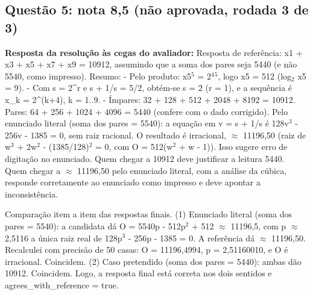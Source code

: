 \documentclass{article}%
\begin{document}
\subsection*{Questão 5: nota 8,5 (não aprovada, rodada 3 de 3)}%
\textbf{Resposta da resolução às cegas do avaliador:} Resposta de referência: x1 + x3 + x5 + x7 + x9 = 10912, assumindo que a soma dos pares seja 5440 (e não 5540, como impresso).\newline%
\newline%
Resumo:\newline%
{-} Pelo produto: x5$^{5}$ = 2$^{4}$$^{5}$, logo x5 = 512 (log$_{2}$ x5 = 9).\newline%
{-} Com s = 2\^{}r e s + 1/s = 5/2, obtém{-}se s = 2 (r = 1), e a sequência é x\_k = 2\^{}(k+4), k = 1..9.\newline%
{-} Ímpares: 32 + 128 + 512 + 2048 + 8192 = 10912. Pares: 64 + 256 + 1024 + 4096 = 5440 (confere com o dado corrigido).\newline%
\newline%
Pelo enunciado literal (soma dos pares = 5540): a equação em v = s + 1/s é 128v$^3$ - 256v - 1385 = 0, sem raiz racional. O resultado é irracional, $\approx$ 11196,50 (raiz de w$^3$ + 2w$^2$ - (1385/128)$^2$ = 0, com O = 512(w$^2$ + w - 1)). Isso sugere erro de digitação no enunciado.\newline%
\newline%
Quem chegar a 10912 deve justificar a leitura 5440. Quem chegar a $\approx$ 11196,50 pelo enunciado literal, com a análise da cúbica, responde corretamente ao enunciado como impresso e deve apontar a inconsistência.\par %
Comparação item a item das respostas finais. (1) Enunciado literal (soma dos pares = 5540): a candidata dá O = 5540p - 512p$^2$ + 512 $\approx$ 11196,5, com p $\approx$ 2,5116 a única raiz real de 128p$^3$ - 256p - 1385 = 0. A referência dá $\approx$ 11196,50. Recalculei com precisão de 50 casas: O = 11196,4994, p = 2,51160010, e O é irracional. Coincidem. (2) Caso pretendido (soma dos pares = 5440): ambas dão 10912. Coincidem. Logo, a resposta final está correta nos dois sentidos e agrees\_with\_reference = true.\newline%
\newline%
$$
\end{document}

